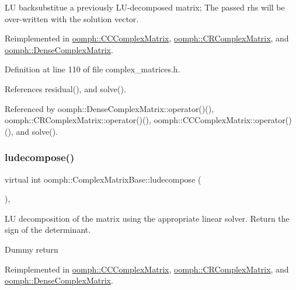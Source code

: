 LU backsubstitue a previously L\+U-\/decomposed matrix; The passed rhs will be over-\/written with the solution vector. 



Reimplemented in \hyperlink{classoomph_1_1CCComplexMatrix_ade5d51dc8e2a44b6c011184366ce052c}{oomph\+::\+C\+C\+Complex\+Matrix}, \hyperlink{classoomph_1_1CRComplexMatrix_ac3cac0e74a1ac57526192a37fd9a1f5b}{oomph\+::\+C\+R\+Complex\+Matrix}, and \hyperlink{classoomph_1_1DenseComplexMatrix_abcd909e71bdcae1059eb8779de72a99d}{oomph\+::\+Dense\+Complex\+Matrix}.



Definition at line 110 of file complex\+\_\+matrices.\+h.



References residual(), and solve().



Referenced by oomph\+::\+Dense\+Complex\+Matrix\+::operator()(), oomph\+::\+C\+R\+Complex\+Matrix\+::operator()(), oomph\+::\+C\+C\+Complex\+Matrix\+::operator()(), and solve().

\mbox{\label{classoomph_1_1ComplexMatrixBase_a11e1beeb7767e9bc5e511c17f80f097f}} 
\subsubsection{\texorpdfstring{ludecompose()}{ludecompose()}}
{\footnotesize\ttfamily virtual int oomph\+::\+Complex\+Matrix\+Base\+::ludecompose (\begin{DoxyParamCaption}{ }\end{DoxyParamCaption})\hspace{0.3cm}{\ttfamily [inline]}, {\ttfamily [virtual]}}



LU decomposition of the matrix using the appropriate linear solver. Return the sign of the determinant. 

Dummy return 

Reimplemented in \hyperlink{classoomph_1_1CCComplexMatrix_a7076d4dc153b80fe4adbedbfb916b395}{oomph\+::\+C\+C\+Complex\+Matrix}, \hyperlink{classoomph_1_1CRComplexMatrix_a8f2e601ccd4bb7c74af3c55cf6c3290b}{oomph\+::\+C\+R\+Complex\+Matrix}, and \hyperlink{classoomph_1_1DenseComplexMatrix_a8503c0e46409613c58261ce6136f88b9}{oomph\+::\+Dense\+Complex\+Matrix}.



